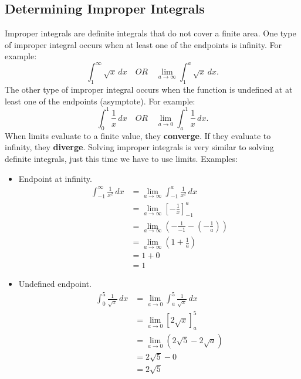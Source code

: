 \documentclass[12pt]{article}
\begin{document}
        \subsection{Determining Improper Integrals}
            Improper integrals are definite integrals that do not cover a finite area.
            \newline \newline
            One type of improper integral occurs when at least one of the endpoints is infinity. For example:
            \[ \int_{1}^{\infty} \sqrt{x} \, dx \quad OR \quad \lim_{a \to \infty} \int_{1}^{a} \sqrt{x} \, dx. \]
            \newline
            The other type of improper integral occurs when the function is undefined at at least one of the endpoints (asymptote). For example:
            \[ \int_{0}^{1} \frac{1}{x} \, dx \quad OR \quad \lim_{a \to 0} \int_{a}^{1} \frac{1}{x} \, dx. \]
            \newline
            When limits evaluate to a finite value, they \textbf{converge}. If they evaluate to infinity, they \textbf{diverge}.
            \newline \newline
            Solving improper integrals is very similar to solving definite integrals, just this time we have to use limits. Examples:
            \begin{itemize}
                \item Endpoint at infinity.
                \begin{align*}
                    \int_{-1}^{\infty} \frac{1}{x^2} \, dx &= \lim_{a \to \infty} \int_{-1}^{a} \frac{1}{x^2} \, dx \\[6pt]
                    &= \lim_{a \to \infty} \left[ -\frac{1}{x} \right]_{-1}^{a} \\[6pt]
                    &= \lim_{a \to \infty} \left( -\frac{1}{-1} - \left( -\frac{1}{a} \right) \right) \\[6pt]
                    &= \lim_{a \to \infty} \left( 1 + \frac{1}{a} \right) \\[6pt]
                    &= 1+0 \\
                    &= 1
                \end{align*}
                \item Undefined endpoint.
                \begin{align*}
                    \int_{0}^{5} \frac{1}{\sqrt{x}} \, dx &= \lim_{a \to 0} \int_{a}^{5} \frac{1}{\sqrt{x}} \, dx \\[6pt]
                    &= \lim_{a \to 0} \left[ 2\sqrt{x} \right]_{a}^{5} \\
                    &= \lim_{a \to 0} \left( 2\sqrt{5} - 2\sqrt{a} \right) \\
                    &= 2\sqrt{5} - 0 \\
                    &= 2\sqrt{5}
                \end{align*}
            \end{itemize}
\end{document}
